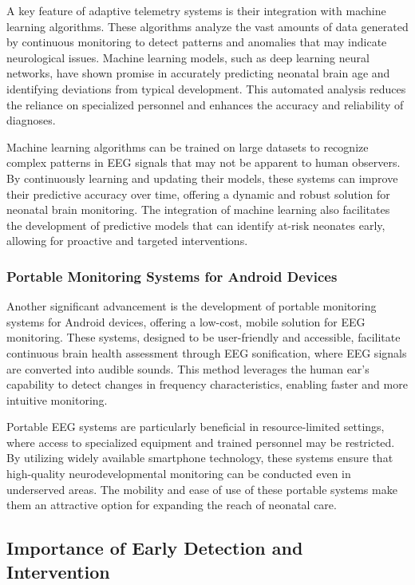 \documentclass[12pt,journal,compsoc]{IEEEtran}
\begin{document}
A key feature of adaptive telemetry systems is their integration with machine learning algorithms. These algorithms analyze the vast amounts of data generated by continuous monitoring to detect patterns and anomalies that may indicate neurological issues. Machine learning models, such as deep learning neural networks, have shown promise in accurately predicting neonatal brain age and identifying deviations from typical development. This automated analysis reduces the reliance on specialized personnel and enhances the accuracy and reliability of diagnoses.

Machine learning algorithms can be trained on large datasets to recognize complex patterns in EEG signals that may not be apparent to human observers. By continuously learning and updating their models, these systems can improve their predictive accuracy over time, offering a dynamic and robust solution for neonatal brain monitoring. The integration of machine learning also facilitates the development of predictive models that can identify at-risk neonates early, allowing for proactive and targeted interventions.

\subsubsection{Portable Monitoring Systems for Android Devices}

Another significant advancement is the development of portable monitoring systems for Android devices, offering a low-cost, mobile solution for EEG monitoring. These systems, designed to be user-friendly and accessible, facilitate continuous brain health assessment through EEG sonification, where EEG signals are converted into audible sounds. This method leverages the human ear's capability to detect changes in frequency characteristics, enabling faster and more intuitive monitoring.

Portable EEG systems are particularly beneficial in resource-limited settings, where access to specialized equipment and trained personnel may be restricted. By utilizing widely available smartphone technology, these systems ensure that high-quality neurodevelopmental monitoring can be conducted even in underserved areas. The mobility and ease of use of these portable systems make them an attractive option for expanding the reach of neonatal care.

\subsection{Importance of Early Detection and Intervention}
\end{document}
